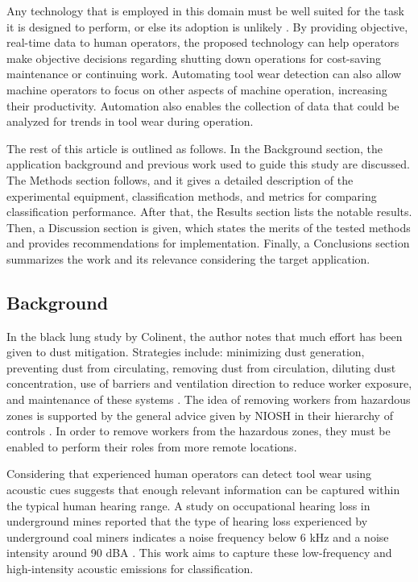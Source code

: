 Any technology that is employed in this domain must be well suited for the task it is
designed to perform, or else its adoption is unlikely \cite{Swanson2019}.
By providing objective, real-time data to human operators, the proposed technology can help operators 
make objective decisions regarding shutting down operations for cost-saving maintenance or continuing work. 
Automating tool wear detection can also allow machine operators to focus on other aspects of machine operation, 
increasing their productivity. Automation also enables the collection of data that could be analyzed 
for trends in tool wear during operation.

The rest of this article is outlined as follows.  In the Background section, the application background 
and previous work used to guide this study are discussed. The Methods section follows, and it gives a 
detailed description of the experimental equipment, classification methods, and metrics for comparing 
classification performance. After that, the Results section lists the notable results. Then, a Discussion 
section is given, which states the merits of the tested methods and provides recommendations for 
implementation. Finally, a Conclusions section summarizes the work and its relevance considering the target application.

\subsection{Background}\label{sec1a}

In the black lung study by Colinent, the author notes that much effort has been given to dust mitigation.
Strategies include: minimizing dust generation, preventing dust from circulating, removing
dust from circulation, diluting dust concentration, use of barriers and ventilation direction
to reduce worker exposure, and maintenance of these systems \cite{Colinent2020}. 
The idea of removing workers from hazardous zones is supported 
 by the general advice given by NIOSH in their hierarchy of controls \cite{niosh_2015}.
In order to remove workers from the hazardous zones, they must be enabled to perform their roles from 
more remote locations. 

Considering that experienced human operators can detect tool wear using acoustic cues
suggests that enough relevant information can be captured within the typical human hearing range.
A study on occupational hearing loss in underground mines reported that the type of hearing loss experienced 
by underground coal miners indicates a noise frequency below 6 kHz and a noise intensity 
around 90 dBA \cite{Erol2022}. 
This work aims to capture these low-frequency and high-intensity acoustic emissions for classification.

